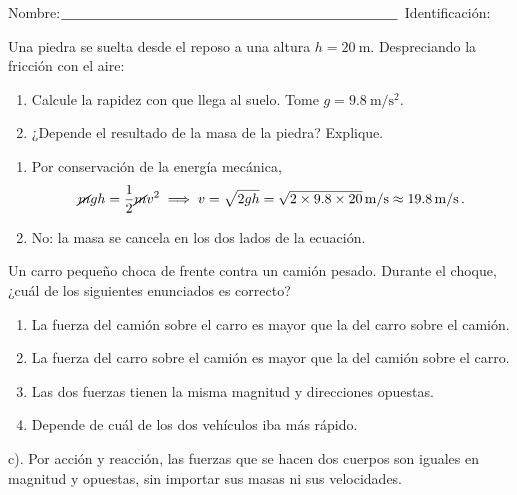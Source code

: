 \vspace*{-2cm}
Nombre:$\underline{\hspace{8.5cm}}$ Identificación: \hrulefill

\quad


\begin{exercise}[ID=caida, subtitle={Caída libre}, tags={examen}, points=50]
Una piedra se suelta desde el reposo a una altura $h=\qty{20}{\m}$. Despreciando la fricción con el aire:
\begin{enumerate}
    \item Calcule la rapidez con que llega al suelo. Tome $g=\qty{9.8}{\m/\s^2}$.
    \item ¿Depende el resultado de la masa de la piedra? Explique.
\end{enumerate}

\vspace{5cm}
\end{exercise}
\begin{solution}
\begin{enumerate}
    \item Por conservación de la energía mecánica,
    \begin{align}
        \cancel{m}gh = \frac{1}{2}\cancel{m}v^2
        \;\Longrightarrow\;
        v = \sqrt{2gh} = \sqrt{2\times 9.8\times 20}\,\unit{\m/\s} \approx \qty{19.8}{\m/\s}\,.
    \end{align}
    \item No: la masa se cancela en los dos lados de la ecuación.
\end{enumerate}
\end{solution}

\begin{exercise}[ID=choque, subtitle={Acción y reacción}, tags={examen}, points=50]
Un carro pequeño choca de frente contra un camión pesado. Durante el choque, ¿cuál de los siguientes enunciados es correcto?
\begin{enumerate}
    \item La fuerza del camión sobre el carro es mayor que la del carro sobre el camión.
    \item La fuerza del carro sobre el camión es mayor que la del camión sobre el carro.
    \item Las dos fuerzas tienen la misma magnitud y direcciones opuestas.
    \item Depende de cuál de los dos vehículos iba más rápido.
\end{enumerate}

\end{exercise}
\begin{solution}
c). Por acción y reacción, las fuerzas que se hacen dos cuerpos son iguales en magnitud y opuestas, sin importar sus masas ni sus velocidades.
\end{solution}

